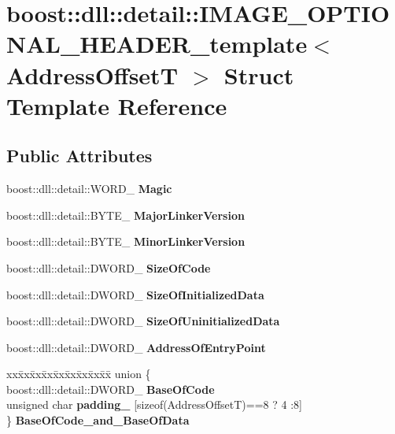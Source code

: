 \hypertarget{a01608}{}\section{boost\+:\+:dll\+:\+:detail\+:\+:I\+M\+A\+G\+E\+\_\+\+O\+P\+T\+I\+O\+N\+A\+L\+\_\+\+H\+E\+A\+D\+E\+R\+\_\+template$<$ Address\+OffsetT $>$ Struct Template Reference}
\label{a01608}
\subsection*{Public Attributes}
\begin{DoxyCompactItemize}
\item 
\mbox{\label{a01608_acaa65770064417f30dc73e6a3aed5758}} 
boost\+::dll\+::detail\+::\+W\+O\+R\+D\+\_\+ {\bfseries Magic}
\item 
\mbox{\label{a01608_a0ddd4ddd0e85133b67a732a9b5cb50a3}} 
boost\+::dll\+::detail\+::\+B\+Y\+T\+E\+\_\+ {\bfseries Major\+Linker\+Version}
\item 
\mbox{\label{a01608_aac0f854928e88ecddb8671f0992212f9}} 
boost\+::dll\+::detail\+::\+B\+Y\+T\+E\+\_\+ {\bfseries Minor\+Linker\+Version}
\item 
\mbox{\label{a01608_a05f3466faf36daea3c6e3f298ffcb57b}} 
boost\+::dll\+::detail\+::\+D\+W\+O\+R\+D\+\_\+ {\bfseries Size\+Of\+Code}
\item 
\mbox{\label{a01608_a6cdeb05a2e3d8836d60ed324db2a7dfb}} 
boost\+::dll\+::detail\+::\+D\+W\+O\+R\+D\+\_\+ {\bfseries Size\+Of\+Initialized\+Data}
\item 
\mbox{\label{a01608_af9f128f5c560e0922e85840049319b53}} 
boost\+::dll\+::detail\+::\+D\+W\+O\+R\+D\+\_\+ {\bfseries Size\+Of\+Uninitialized\+Data}
\item 
\mbox{\label{a01608_a58d74a4050edd2858c03cb5c984ac5af}} 
boost\+::dll\+::detail\+::\+D\+W\+O\+R\+D\+\_\+ {\bfseries Address\+Of\+Entry\+Point}
\item 
\mbox{\label{a01608_a10b0fad982495fcb899f80f6a96802e8}} 
\begin{tabbing}
xx\=xx\=xx\=xx\=xx\=xx\=xx\=xx\=xx\=\kill
union \{\\
\>boost::dll::detail::DWORD\_ {\bfseries BaseOfCode}\\
\>unsigned char {\bfseries padding\_} \mbox{[}sizeof(AddressOffsetT)==8 ? 4 :8\mbox{]}\\
\} {\bfseries BaseOfCode\_and\_BaseOfData}\\


\end{tabbing}
\end{DoxyCompactItemize}
